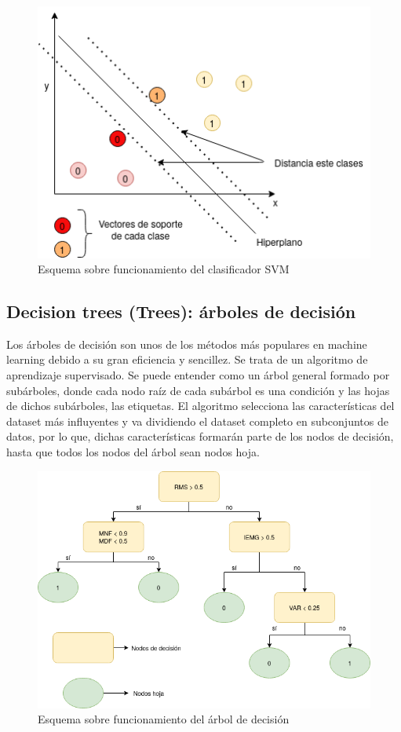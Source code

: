     \begin{figure}[ht]
    \centering
    \includegraphics[width=1.0\textwidth]{imagenes/svm.png}
    \caption{ Esquema sobre funcionamiento del clasificador SVM }
    \label{fig:svm}
    \end{figure}
    
    \newpage
    \subsection{Decision trees (Trees): árboles de decisión}
    Los árboles de decisión son unos de los métodos más populares en machine learning debido a su gran eficiencia y sencillez. Se trata de un algoritmo de aprendizaje supervisado. Se puede entender como un árbol general formado por subárboles, donde cada nodo raíz de cada subárbol es una condición y las hojas de dichos subárboles, las etiquetas. El algoritmo selecciona las características del dataset más influyentes y va dividiendo el dataset completo en subconjuntos de datos, por lo que, dichas características formarán parte de los nodos de decisión, hasta que todos los nodos del árbol sean nodos hoja.
    
    
    \begin{figure}[!ht]
    \centering
    \includegraphics[width=1.0\textwidth]{imagenes/arboles de decision.png}
    \caption{ Esquema sobre funcionamiento del árbol de decisión }
    \label{fig:arbol}
    \end{figure}
    
